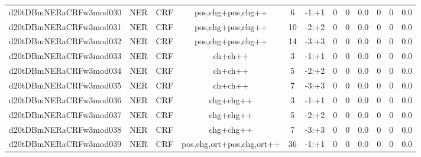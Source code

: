 \documentclass[a4paper]{article}
\begin{document}
\begin{landscape}
\begin{center}
\begin{tabular}{ |c|c|c|c|c|c|c|c|c|c|c|c|}
 
 	
 	\small{ d20tDBmNERaCRFw3mod030 } & \small{ NER} & \small{  CRF }  & pos,chg+pos,chg++  &  6 &  \small{  -1:+1 }  &  0 & 0 & 0.0  &  0 & 0 & 0.0 \\
 	

 
 	
 	\small{ d20tDBmNERaCRFw3mod031 } & \small{ NER} & \small{  CRF }  & pos,chg+pos,chg++  &  10 &  \small{  -2:+2 }  &  0 & 0 & 0.0  &  0 & 0 & 0.0 \\
 	

 
 	
 	\small{ d20tDBmNERaCRFw3mod032 } & \small{ NER} & \small{  CRF }  & pos,chg+pos,chg++  &  14 &  \small{  -3:+3 }  &  0 & 0 & 0.0  &  0 & 0 & 0.0 \\
 	

 
 	
 	\small{ d20tDBmNERaCRFw3mod033 } & \small{ NER} & \small{  CRF }  & ch+ch++  &  3 &  \small{  -1:+1 }  &  0 & 0 & 0.0  &  0 & 0 & 0.0 \\
 	

 
 	
 	\small{ d20tDBmNERaCRFw3mod034 } & \small{ NER} & \small{  CRF }  & ch+ch++  &  5 &  \small{  -2:+2 }  &  0 & 0 & 0.0  &  0 & 0 & 0.0 \\
 	

 
 	
 	\small{ d20tDBmNERaCRFw3mod035 } & \small{ NER} & \small{  CRF }  & ch+ch++  &  7 &  \small{  -3:+3 }  &  0 & 0 & 0.0  &  0 & 0 & 0.0 \\
 	

 
 	
 	\small{ d20tDBmNERaCRFw3mod036 } & \small{ NER} & \small{  CRF }  & chg+chg++  &  3 &  \small{  -1:+1 }  &  0 & 0 & 0.0  &  0 & 0 & 0.0 \\
 	

 
 	
 	\small{ d20tDBmNERaCRFw3mod037 } & \small{ NER} & \small{  CRF }  & chg+chg++  &  5 &  \small{  -2:+2 }  &  0 & 0 & 0.0  &  0 & 0 & 0.0 \\
 	

 
 	
 	\small{ d20tDBmNERaCRFw3mod038 } & \small{ NER} & \small{  CRF }  & chg+chg++  &  7 &  \small{  -3:+3 }  &  0 & 0 & 0.0  &  0 & 0 & 0.0 \\
 	

 
 	
 	\small{ d20tDBmNERaCRFw3mod039 } & \small{ NER} & \small{  CRF }  & pos,chg,ort+pos,chg,ort++  &  36 &  \small{  -1:+1 }  &  0 & 0 & 0.0  &  0 & 0 & 0.0 \\
 	


\end{tabular}
\end{center}
\end{landscape}
\end{document}
